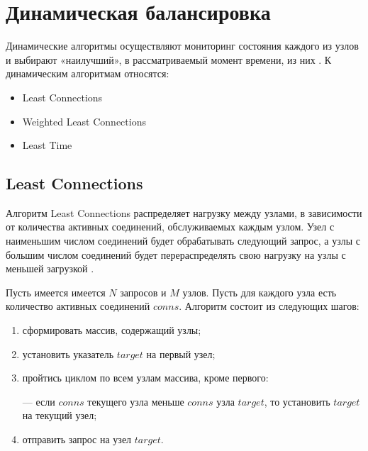 \begin{comment}

Процесс работы статической балансировки выглядит следующим образом:
\begin{enumerate}[label=---]
	\item Балансировщик нагрузки получает запрос от клиента.
	\item Балансировщик принимает решение о том, на какой сервер направить запрос, основываясь на предварительных настройках.
	\item Балансировщик перенаправляет запрос на выбранный сервер.
	\item Сервер обрабатывает запрос и отправляет ответ клиенту через балансировщик.
\end{enumerate}
\end{comment}


\section{Динамическая балансировка}

Динамические алгоритмы осуществляют мониторинг состояния каждого из узлов и выбирают «наилучший», в рассматриваемый момент времени, из них \cite{webmanage}. К динамическим алгоритмам относятся:
\begin{itemize}
	\item Least Connections
	\item Weighted Least Connections
	\item Least Time
\end{itemize}

\subsection{Least Connections}

Алгоритм Least Connections распределяет нагрузку между узлами, в зависимости от количества активных соединений, обслуживаемых каждым узлом.
Узел с наименьшим числом соединений будет обрабатывать следующий запрос, а узлы с большим числом соединений будет перераспределять свою нагрузку на узлы с меньшей загрузкой \cite{leastconnection}.


Пусть имеется имеется $N$ запросов и $M$ узлов. Пусть для каждого узла есть количество активных соединений $conns$.
Алгоритм состоит из следующих шагов:

\begin{enumerate}
	\item сформировать массив, содержащий узлы;
	\item установить указатель $target$ на первый узел;
	\item пройтись циклом по всем узлам массива, кроме первого:
	
	--- если $conns$ текущего узла меньше $conns$ узла $target$, то установить $target$ на текущий узел; 
	
	\item отправить запрос на узел $target$.
\end{enumerate}


